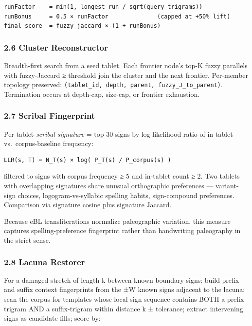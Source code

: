 \documentclass[
  11pt,
  letterpaper,
]{article}
\begin{document}
\begin{verbatim}
runFactor    = min(1, longest_run / sqrt(query_trigrams))
runBonus     = 0.5 × runFactor              (capped at +50% lift)
final_score  = fuzzy_jaccard × (1 + runBonus)
\end{verbatim}

\subsubsection{2.6 Cluster Reconstructor}\label{cluster-reconstructor}

Breadth-first search from a seed tablet. Each frontier node's top-K
fuzzy parallels with fuzzy-Jaccard ≥ threshold join the cluster and the
next frontier. Per-member topology preserved:
\texttt{(tablet\_id,\ depth,\ parent,\ fuzzy\_J\_to\_parent)}.
Termination occurs at depth-cap, size-cap, or frontier exhaustion.

\subsubsection{2.7 Scribal Fingerprint}\label{scribal-fingerprint}

Per-tablet \emph{scribal signature} = top-30 signs by log-likelihood
ratio of in-tablet vs.~corpus-baseline frequency:

\begin{verbatim}
LLR(s, T) = N_T(s) × log( P_T(s) / P_corpus(s) )
\end{verbatim}

filtered to signs with corpus frequency ≥ 5 and in-tablet count ≥ 2. Two
tablets with overlapping signatures share unusual orthographic
preferences --- variant-sign choices, logogram-vs-syllabic spelling
habits, sign-compound preferences. Comparison via signature cosine plus
signature Jaccard.

Because eBL transliterations normalize paleographic variation, this
measure captures spelling-preference fingerprint rather than handwriting
paleography in the strict sense.

\subsubsection{2.8 Lacuna Restorer}\label{lacuna-restorer}

For a damaged stretch of length k between known boundary signs: build
prefix and suffix context fingerprints from the ±W known signs adjacent
to the lacuna; scan the corpus for templates whose local sign sequence
contains BOTH a prefix-trigram AND a suffix-trigram within distance k ±
tolerance; extract intervening signs as candidate fills; score by:
\end{document}

